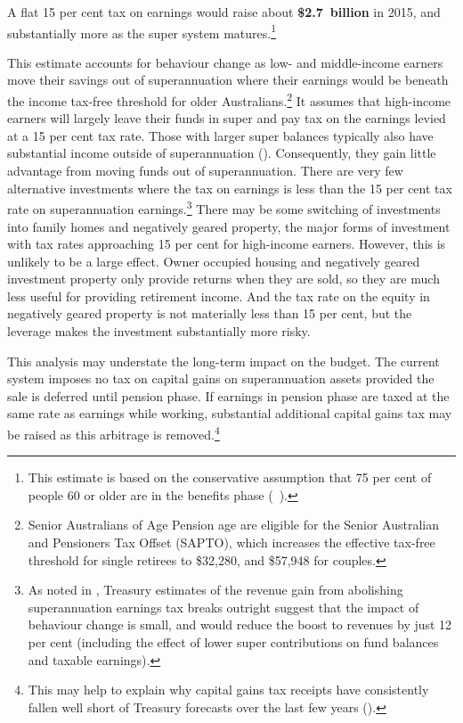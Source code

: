 A flat 15 per cent tax on earnings would raise about \textbf{\$2.7~billion} in 2015, and substantially more as the super system matures.\footnote{This estimate is based on the conservative assumption that 75 per cent of people 60 or older are in the benefits phase (\gao\ \textcite{ABS2013t}).}

This estimate accounts for behaviour change as low- and middle-income earners move their savings out of superannuation where their earnings would be beneath the income tax-free threshold for older Australians.\footnote{Senior Australians of Age Pension age are eligible for the Senior Australian and Pensioners Tax Offset (SAPTO), which increases the effective tax-free threshold for single retirees to \$32,280, and \$57,948 for couples.}  It assumes that high-income earners will largely leave their funds in super and pay tax on the earnings levied at a 15 per cent tax rate. Those with larger super balances typically also have substantial income outside of superannuation (). Consequently, they gain little advantage from moving funds out of superannuation. There are very few alternative investments where the tax on earnings is less than the 15 per cent tax rate on superannuation earnings.\footnote{As noted in , Treasury estimates of the revenue gain from abolishing superannuation earnings tax breaks outright suggest that the impact of behaviour change is small, and would reduce the boost to revenues by just 12 per cent (including the effect of lower super contributions on fund balances and taxable earnings).}  There may be some switching of investments into family homes and negatively geared property, the major forms of investment with tax rates approaching 15 per cent for high-income earners. However, this is unlikely to be a large effect. Owner occupied housing and negatively geared investment property only provide returns when they are sold, so they are much less useful for providing retirement income. And the tax rate on the equity in negatively geared property is not materially less than 15 per cent, but the leverage makes the investment substantially more risky.  

This analysis may understate the long-term impact on the budget. The current system imposes no tax on capital gains on superannuation assets provided the sale is deferred until pension phase. If earnings in pension phase are taxed at the same rate as earnings while working, substantial additional capital gains tax may be raised as this arbitrage is removed.\footnote{This may help to explain why capital gains tax receipts have consistently fallen well short of Treasury forecasts over the last few years (\textcite[][51]{Treasury2012ReviewMacroRevenueForecasts}).}

